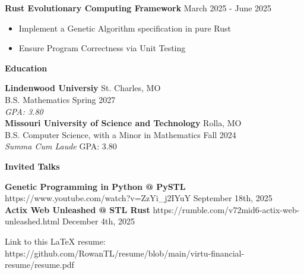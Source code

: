 \documentclass[11pt]{article}
\begin{document}
\textbf{Rust Evolutionary Computing Framework} \hfill March 2025 - June 2025
\begin{itemize}[noitemsep, topsep=0pt, partopsep=0pt, parsep=0pt, itemsep=0pt]
    \item Implement a Genetic Algorithm specification in pure Rust
    \item Ensure Program Correctness via Unit Testing
\end{itemize}

\begin{center}
    \textbf{Education}
\end{center}
\textbf{Lindenwood Universiy} \hfill St. Charles, MO \\
B.S. Mathematics \hfill Spring 2027 \\
\textit{GPA: 3.80}\\

\textbf{Missouri University of Science and Technology} \hfill Rolla, MO \\
B.S. Computer Science, with a Minor in Mathematics \hfill Fall 2024  \\
\textit{Summa Cum Laude} \hfill GPA: 3.80

\begin{center}
    \textbf{Invited Talks}
\end{center}

\textbf{Genetic Programming in Python @ PySTL} \tiny{https://www.youtube.com/watch?v=ZzYi\_j2IYuY} \hfill \normalsize{September 18th, 2025} \\
\textbf{Actix Web Unleashed @ STL Rust} \tiny{https://rumble.com/v72mid6-actix-web-unleashed.html} \hfill \normalsize{December 4th, 2025}

\begin{center}
    \tiny{Link to this LaTeX resume: https://github.com/RowanTL/resume/blob/main/virtu-financial-resume/resume.pdf}
\end{center}
\end{document}
